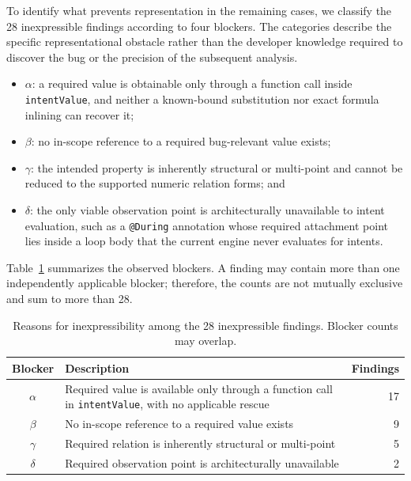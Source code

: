 \documentclass[pdflatex,sn-basic]{sn-jnl}%
\theoremstyle{thmstyleone}%
\theoremstyle{thmstyletwo}%
\theoremstyle{thmstylethree}%
\begin{document}
To identify what prevents representation in the remaining cases, we classify the
28 inexpressible findings according to four blockers. The categories describe the
specific representational obstacle rather than the developer knowledge required to
discover the bug or the precision of the subsequent analysis.

\begin{itemize}
    \item $\alpha$: a required value is obtainable only through a function call
    inside \texttt{intentValue}, and neither a known-bound substitution nor exact
    formula inlining can recover it;
    \item $\beta$: no in-scope reference to a required bug-relevant value exists;
    \item $\gamma$: the intended property is inherently structural or multi-point
    and cannot be reduced to the supported numeric relation forms; and
    \item $\delta$: the only viable observation point is architecturally unavailable
    to intent evaluation, such as a \texttt{@During} annotation whose required
    attachment point lies inside a loop body that the current engine never evaluates
    for intents.
\end{itemize}

Table~\ref{tab:rq1-blockers} summarizes the observed blockers. A finding may contain
more than one independently applicable blocker; therefore, the counts are not
mutually exclusive and sum to more than 28.

\begin{table}[t]
\centering
\caption{Reasons for inexpressibility among the 28 inexpressible findings.
Blocker counts may overlap.}
\label{tab:rq1-blockers}
\small
\begin{tabular}{c p{6.5cm} r}
\toprule
\textbf{Blocker} & \textbf{Description} & \textbf{Findings} \\
\midrule
$\alpha$ &
Required value is available only through a function call in
\texttt{intentValue}, with no applicable rescue
& 17 \\

$\beta$ &
No in-scope reference to a required value exists
& 9 \\

$\gamma$ &
Required relation is inherently structural or multi-point
& 5 \\

$\delta$ &
Required observation point is architecturally unavailable
& 2 \\
\bottomrule
\end{tabular}
\end{table}
\end{document}
